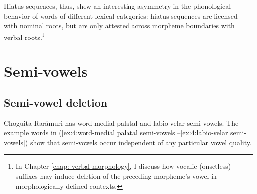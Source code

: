     \z
\z

Hiatus sequences, thus, show an interesting asymmetry in the phonological behavior of words of different lexical categories: hiatus sequences are licensed with nominal roots, but are only attested across morpheme boundaries with verbal roots.\footnote{In Chapter \ref{chap: verbal morphology}, I discuss how vocalic (onsetless) suffixes may induce deletion of the preceding morpheme’s vowel in morphologically defined contexts.}

\section{Semi-vowels}
\label{sec: semi-vowels}
\subsection{Semi-vowel deletion}
\label{subsec: semi-vowel deletion}

Choguita Rarámuri has word-medial palatal and labio-velar semi-vowels. The example words in (\ref{ex:4:word-medial palatal semi-vowels}--\ref{ex:4:labio-velar semi-vowels}) show that semi-vowels occur independent of any particular vowel quality.

